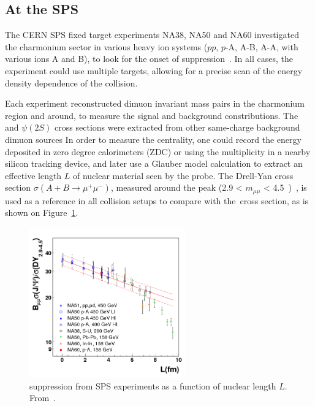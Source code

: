 \subsection{At the SPS}


The
CERN SPS fixed target experiments NA38, NA50 and NA60 investigated the
charmonium sector in various heavy ion systems ($pp$, $p$-A, A-B, A-A,
with various ions A and B), to look for the onset of suppression~\cite{Baglin:1990iv,Abreu:1997jh,Abreu:2000xe,Abreu:2000ni,Alessandro:2004ap,jpsiNA60}. In all cases, the
experiment could use multiple targets, allowing for a precise scan of
the energy density dependence of the collision. 

Each experiment reconstructed dimuon invariant mass pairs in the
charmonium region and around, to measure the signal and background
constributions. The \Jpsi and $\psi(2S)$ cross sections were extracted
from other same-charge background dimuon sources %
In order to measure the centrality,
one could record the energy deposited in zero degree calorimeters
(ZDC) or using the multiplicity in a nearby silicon tracking device, and
later use a Glauber model calculation to extract an effective length $L$ of
nuclear material seen by the probe. The Drell-Yan cross section
$\sigma(A+B \to \mu^+\mu^-)$, measured
around the \Jpsi peak (2.9 < $m_{\mu\mu}$ < 4.5~\unitMass)~\cite{Alessandro:2004ap}, is used as a
reference in all collision setups to compare with the~\Jpsi cross
section, as is shown on Figure~\ref{fig:na60}.



\begin{figure}[htb]
\begin{center}
  \includegraphics[width=0.6\textwidth]{Chapters/pQuarkonia/NA60.png}
  \caption{\Jpsi suppression from SPS experiments as a function of
    nuclear length $L$. From~\cite{compilSPS}.}
  \label{fig:na60}
\end{center}
\end{figure}



